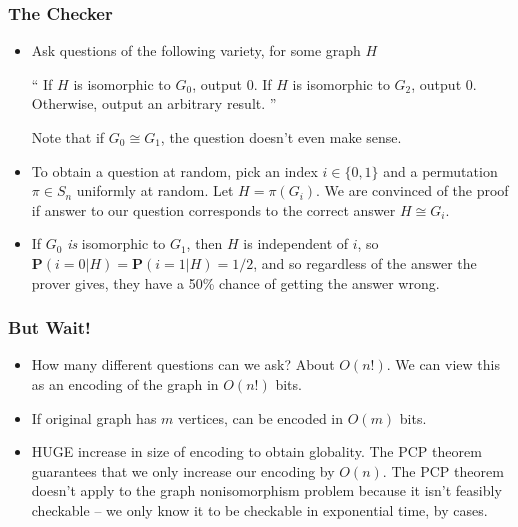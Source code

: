 \documentclass{beamer}
\begin{document}
\begin{frame}
    \frametitle{The Checker}

    \begin{itemize}
        \item<1-> Ask questions of the following variety, for some graph $H$
        \begin{center}
            `` If $H$ is isomorphic to $G_0$, output 0. If $H$ is isomorphic to $G_2$, output 0. Otherwise, output an arbitrary result. ''
        \end{center}
        Note that if $G_0 \cong G_1$, the question doesn't even make sense.

        \item<2-> To obtain a question at random, pick an index $i \in \{ 0, 1 \}$ and a permutation $\pi \in S_n$ uniformly at random. Let $H = \pi(G_i)$. We are convinced of the proof if answer to our question corresponds to the correct answer $H \cong G_i$.

        \item<3-> If $G_0$ {\it is} isomorphic to $G_1$, then $H$ is independent of $i$, so $\mathbf{P}(i = 0 | H) = \mathbf{P}(i = 1 | H) = 1/2$, and so regardless of the answer the prover gives, they have a 50\% chance of getting the answer wrong.
    \end{itemize}

\end{frame}

\begin{frame}
    \frametitle{But Wait!}

    \begin{itemize}
        \item<1-> How many different questions can we ask? About $O(n!)$. We can view this as an encoding of the graph in $O(n!)$ bits.
        \item<2-> If original graph has $m$ vertices, can be encoded in $O(m)$ bits.
        \item<3-> HUGE increase in size of encoding to obtain globality. The PCP theorem guarantees that we only increase our encoding by $O(n)$. The PCP theorem doesn't apply to the graph nonisomorphism problem because it isn't feasibly checkable -- we only know it to be checkable in exponential time, by cases.
    \end{itemize}
\end{frame}
\end{document}
